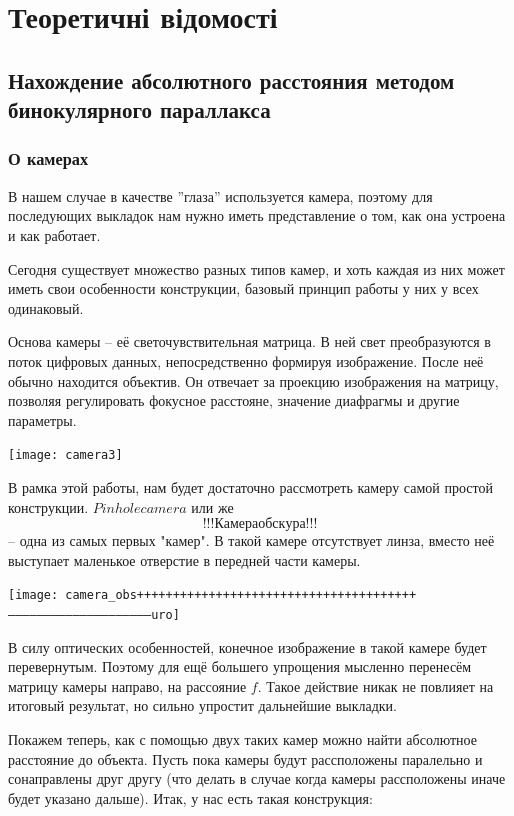 \chapter{Теоретичні відомості}

\section{Нахождение абсолютного расстояния методом бинокулярного параллакса}

\subsection{О камерах}
	В нашем случае в качестве ''глаза'' используется камера, поэтому для последующих выкладок нам нужно иметь представление о том, как она устроена и как работает.
	
	Сегодня существует множество разных типов камер, и хоть каждая из них может иметь свои особенности конструкции, базовый принцип работы у них у всех одинаковый.
	
	Основа камеры -- её светочувствительная матрица. В ней свет преобразуются в поток цифровых данных, непосредственно формируя изображение. После неё обычно находится объектив. Он отвечает за проекцию изображения на матрицу, позволяя регулировать фокусное расстояне, значение диафрагмы и другие параметры. 
	
		\texttt{[image: camera3]}
		
	В рамка этой работы, нам будет достаточно рассмотреть камеру самой простой конструкции. $Pinhole camera$ или же $$!!!Камера обскура!!!$$ -- одна из самых первых "камер". В такой камере отсутствует линза, вместо неё выступает маленькое отверстие в передней части камеры.
	
		\texttt{[image: camera\_obs+++++++++++++++++++++++++++++++++++++++-----------------------------------------------------------uro]}

	В силу оптических особенностей, конечное изображение в такой камере будет перевернутым. Поэтому для ещё большего упрощения мысленно перенесём матрицу камеры направо, на рассояние $f$. Такое действие никак не повлияет на итоговый результат, но сильно упростит дальнейшие выкладки.

	Покажем теперь, как с помощью двух таких камер можно найти абсолютное расстояние до объекта. 
Пусть пока камеры будут рассположены паралельно и сонаправлены друг другу (что делать в случае когда камеры рассположены иначе будет указано дальше).
	Итак, у нас есть такая конструкция:
	
